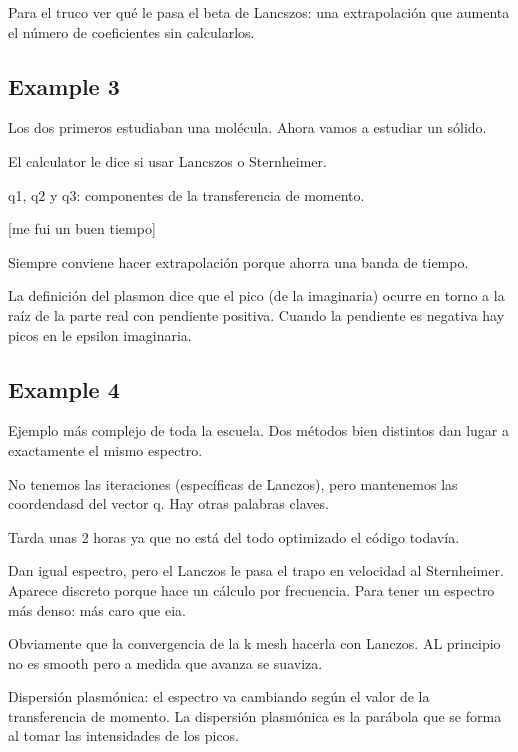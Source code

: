   Para el truco ver qué le pasa el beta de Lancszos: una extrapolación que aumenta el número de coeficientes sin calcularlos.

\subsection{Example 3}

  Los dos primeros estudiaban una molécula. Ahora vamos a estudiar un sólido.

  El calculator le dice si usar Lancszos o Sternheimer.

  q1, q2 y q3: componentes de la transferencia de momento.

  [me fui un buen tiempo]

  Siempre conviene hacer extrapolación porque ahorra una banda de tiempo.

  La definición del plasmon dice que el pico (de la imaginaria) ocurre en torno a la raíz de la parte real con pendiente positiva. Cuando la pendiente es negativa hay picos en le epsilon imaginaria.

\subsection{Example 4}

  Ejemplo más complejo de toda la escuela. Dos métodos bien distintos dan lugar a exactamente el mismo espectro.

  No tenemos las iteraciones (específicas de Lanczos), pero mantenemos las coordendasd del vector q. Hay otras palabras claves.

  Tarda unas 2 horas ya que no está del todo optimizado el código todavía.

  Dan igual espectro, pero el Lanczos le pasa el trapo en velocidad al Sternheimer. Aparece discreto porque hace un cálculo por frecuencia. Para tener un espectro más denso: más caro que eia.

  Obviamente que la convergencia de la k mesh hacerla con Lanczos. AL principio no es smooth pero a medida que avanza se suaviza.

  Dispersión plasmónica: el espectro va cambiando según el valor de la transferencia de momento. La dispersión plasmónica es la parábola que se forma al tomar las intensidades de los picos.
